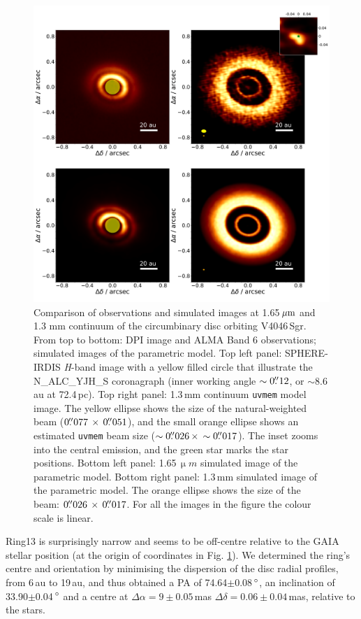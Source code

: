 \documentclass[letters,usenatbib,times]{mnras}
\begin{document}
\begin{figure}
  \includegraphics[width=\textwidth]{hot_two_E.pdf}
  \caption{Comparison of observations and simulated images at 1.65\,$\hbox{$\mu$m}$ and 1.3 mm continuum of the circumbinary disc orbiting V4046\,Sgr. From top to bottom: DPI image and ALMA Band 6 observations; simulated images of the parametric model. Top left panel: SPHERE-IRDIS \textit{H}-band image with a yellow filled circle that illustrate the N\_ALC\_YJH\_S coronagraph (inner working angle $\sim0\hbox{$.\!\!^{\prime\prime}$}12$, or $\sim$8.6\,au at 72.4\,pc). Top right panel: 1.3\,mm continuum {\tt uvmem} model image. The yellow ellipse shows the size of the natural-weighted beam ($ 0\hbox{$.\!\!^{\prime\prime}$}077 \, \times \, 0\hbox{$.\!\!^{\prime\prime}$}051$), and the small orange ellipse shows an estimated {\tt uvmem} beam size ($\sim0\hbox{$.\!\!^{\prime\prime}$}026 \, \times \, \sim0\hbox{$.\!\!^{\prime\prime}$}017$). The inset zooms into the central emission, and the green star marks the star positions. Bottom left panel: 1.65\,$\upmu m$ simulated image of the parametric model. Bottom right panel: 1.3\,mm simulated image of the parametric model. The orange ellipse shows the size of the beam: $0\hbox{$.\!\!^{\prime\prime}$}026 \, \times \, 0\hbox{$.\!\!^{\prime\prime}$}017$. For all the images in the figure the colour scale is linear.}
  \label{fig:images_vs_simulated}
\end{figure}

Ring13 is surprisingly narrow and seems to be off-centre relative to the GAIA stellar position (at the origin of coordinates in Fig. \ref{fig:images_vs_simulated}). We determined the ring's centre and orientation by minimising the dispersion of the disc radial profiles, from 6\,au to 19\,au, and thus obtained a PA of 74.64$\pm$0.08\,$\hbox{$^\circ$}$, an inclination of 33.90$\pm$0.04\,$\hbox{$^\circ$}$ and a centre at $\Delta \alpha = 9\pm0.05$\,mas $\Delta \delta = 0.06\pm0.04$\,mas, relative to the stars.
\end{document}
